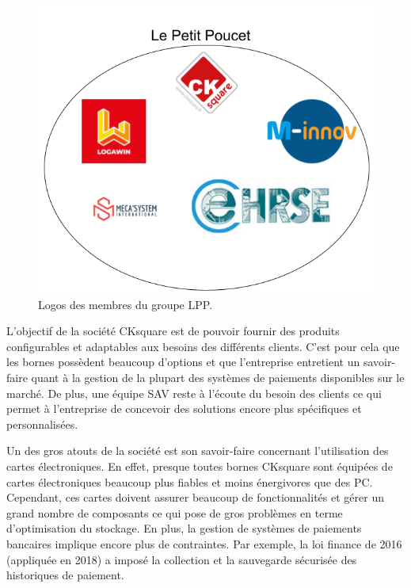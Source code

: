 \documentclass[a4paper]{article}
\begin{document}
\begin{figure}[h!]
  \begin{center}
  \includegraphics[scale=0.4]{./img/lpp-logos.png}
  \caption{Logos des membres du groupe LPP.}
    \label{lpp-logos}
  \end{center}
\end{figure}

L'objectif de la société CKsquare est de pouvoir fournir des produits
configurables et adaptables aux besoins des différents clients. C'est pour cela
que les bornes possèdent beaucoup d'options et que l'entreprise entretient un
savoir-faire quant à la gestion de la plupart des systèmes de paiements
disponibles sur le marché. De plus, une équipe SAV reste à l'écoute du besoin
des clients ce qui permet à l'entreprise de concevoir des solutions encore plus
spécifiques et personnalisées.

Un des gros atouts de la société est son savoir-faire concernant l'utilisation
des cartes électroniques. En effet, presque toutes bornes CKsquare sont équipées
de cartes électroniques beaucoup plus fiables et moins énergivores que des PC.
Cependant, ces cartes doivent assurer beaucoup de fonctionnalités et gérer un
grand nombre de composants ce qui pose de gros problèmes en terme d'optimisation
du stockage. En plus, la gestion de systèmes de paiements bancaires implique
encore plus de contraintes. Par exemple, la loi finance de 2016 (appliquée en
2018) a imposé la collection et la sauvegarde sécurisée des historiques de
paiement.
\end{document}
